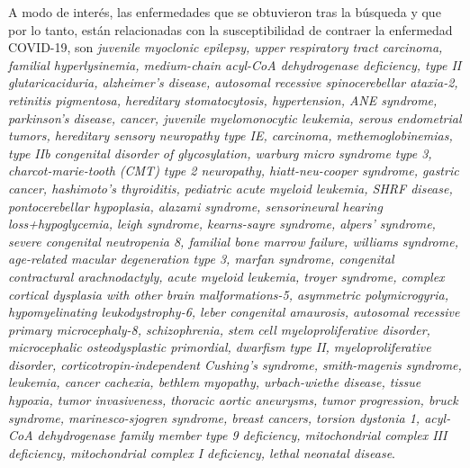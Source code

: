 \newline

A modo de interés, las enfermedades que se obtuvieron tras la búsqueda y que por lo tanto, están relacionadas con la susceptibilidad de contraer la enfermedad COVID-19, son \textit{juvenile myoclonic epilepsy, upper respiratory tract carcinoma, familial hyperlysinemia, medium-chain acyl-CoA dehydrogenase deficiency, type II glutaricaciduria, alzheimer's disease, autosomal recessive spinocerebellar ataxia-2, retinitis pigmentosa, hereditary stomatocytosis, hypertension, ANE syndrome, parkinson's disease, cancer, juvenile myelomonocytic leukemia, serous endometrial tumors, hereditary sensory neuropathy type IE, carcinoma, methemoglobinemias, type IIb congenital disorder of glycosylation, warburg micro syndrome type 3, charcot-marie-tooth (CMT) type 2 neuropathy, hiatt-neu-cooper syndrome, gastric cancer, hashimoto's thyroiditis, pediatric acute myeloid leukemia, SHRF disease, pontocerebellar hypoplasia, alazami syndrome, sensorineural hearing loss+hypoglycemia, leigh syndrome, kearns-sayre syndrome, alpers' syndrome, severe congenital neutropenia 8, familial bone marrow failure, williams syndrome, age-related macular degeneration type 3, marfan syndrome, congenital contractural arachnodactyly, acute myeloid leukemia, troyer syndrome, complex cortical dysplasia with other brain malformations-5, asymmetric polymicrogyria, hypomyelinating leukodystrophy-6, leber congenital amaurosis, autosomal recessive primary microcephaly-8, schizophrenia, stem cell myeloproliferative disorder, microcephalic osteodysplastic primordial,  dwarfism type II, myeloproliferative disorder, corticotropin-independent Cushing's syndrome, smith-magenis syndrome, leukemia, cancer cachexia, bethlem myopathy, urbach-wiethe disease, tissue hypoxia, tumor invasiveness, thoracic aortic aneurysms, tumor progression, bruck syndrome, marinesco-sjogren syndrome, breast cancers, torsion dystonia 1, acyl-CoA dehydrogenase family member type 9 deficiency, mitochondrial complex III deficiency, mitochondrial complex I deficiency, lethal neonatal disease}.